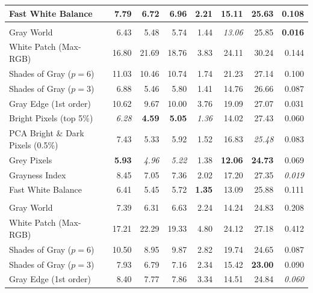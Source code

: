 \begin{longtable}{@{}>{\raggedright\arraybackslash}p{6.8cm}rrrrrrr@{}}
Fast White Balance~\cite{fast_wb_greyness} & 7.79 & 6.72 & 6.96 & 2.21 & 15.11 & 25.63 & 0.108 \\
\midrule
\multicolumn{8}{@{}l}{\textbf{Cube++~\cite{ershov2020cube} ($N=4866$)}} \\
\midrule
Gray World~\cite{gray_world} & 6.43 & 5.48 & 5.74 & 1.44 & \textit{13.06} & 25.85 & \textbf{0.016} \\
White Patch (Max-RGB)~\cite{white_patch} & 16.80 & 21.69 & 18.76 & 3.83 & 24.11 & 30.24 & 0.144 \\
Shades of Gray ($p=6$)~\cite{shades_of_gray} & 11.03 & 10.46 & 10.74 & 1.74 & 21.23 & 27.14 & 0.100 \\
Shades of Gray ($p=3$)~\cite{shades_of_gray} & 6.88 & 5.46 & 5.80 & 1.41 & 14.76 & 26.66 & 0.087 \\
Gray Edge (1st order)~\cite{gray_edge} & 10.62 & 9.67 & 10.00 & 3.76 & 19.09 & 27.07 & 0.031 \\
Bright Pixels (top 5\%)~\cite{bright_pixels} & \textit{6.28} & \textbf{4.59} & \textbf{5.05} & \textit{1.36} & 14.02 & 27.43 & 0.060 \\
PCA Bright \& Dark Pixels (0.5\%)~\cite{cheng2014illuminant} & 7.43 & 5.33 & 5.92 & 1.52 & 16.83 & \textit{25.48} & 0.083 \\
Grey Pixels~\cite{yangGrayPixels} & \textbf{5.93} & \textit{4.96} & \textit{5.22} & 1.38 & \textbf{12.06} & \textbf{24.73} & 0.069 \\
Grayness Index~\cite{qianFindingGrayPixels} & 8.45 & 7.05 & 7.36 & 2.02 & 17.20 & 27.35 & \textit{0.019} \\
Fast White Balance~\cite{fast_wb_greyness} & 6.41 & 5.45 & 5.72 & \textbf{1.35} & 13.09 & 25.88 & 0.111 \\
\midrule
\multicolumn{8}{@{}l}{\textbf{NUS 8-Camera~\cite{cheng2014illuminant} ($N=1736$)}} \\
\midrule
Gray World~\cite{gray_world} & 7.39 & 6.31 & 6.63 & 2.24 & 14.24 & 24.83 & 0.208 \\
White Patch (Max-RGB)~\cite{white_patch} & 17.21 & 22.29 & 19.33 & 4.80 & 24.12 & 27.18 & 0.412 \\
Shades of Gray ($p=6$)~\cite{shades_of_gray} & 10.50 & 8.95 & 9.87 & 2.82 & 19.74 & 24.65 & 0.087 \\
Shades of Gray ($p=3$)~\cite{shades_of_gray} & 7.93 & 6.79 & 7.16 & 2.34 & 15.42 & \textbf{23.00} & 0.090 \\
Gray Edge (1st order)~\cite{gray_edge} & 8.40 & 7.77 & 7.86 & 3.34 & 14.51 & 24.84 & \textit{0.060} \\

\end{longtable}
